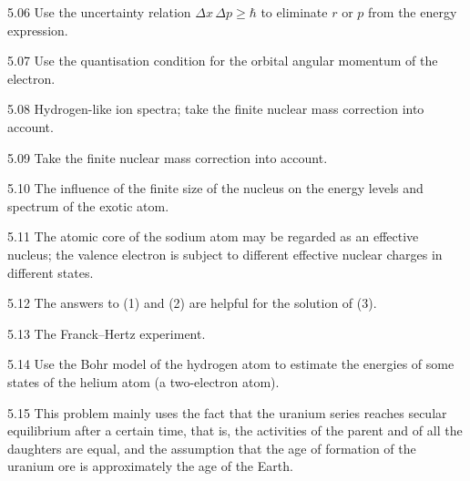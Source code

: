 \begin{hint}{5.06}
Use the uncertainty relation $\Delta x\,\Delta p\geq\hbar$ to eliminate $r$ or $p$ from the energy expression.
\end{hint}

\begin{hint}{5.07}
Use the quantisation condition for the orbital angular momentum of the electron.
\end{hint}

\begin{hint}{5.08}
Hydrogen-like ion spectra; take the finite nuclear mass correction into account.
\end{hint}

\begin{hint}{5.09}
Take the finite nuclear mass correction into account.
\end{hint}

\begin{hint}{5.10}
The influence of the finite size of the nucleus on the energy levels and spectrum of the exotic atom.
\end{hint}

\begin{hint}{5.11}
The atomic core of the sodium atom may be regarded as an effective nucleus; the valence electron is subject to different effective nuclear charges in different states.
\end{hint}

\begin{hint}{5.12}
The answers to (1) and (2) are helpful for the solution of (3).
\end{hint}

\begin{hint}{5.13}
The Franck--Hertz experiment.
\end{hint}

\begin{hint}{5.14}
Use the Bohr model of the hydrogen atom to estimate the energies of some states of the helium atom (a two-electron atom).
\end{hint}

\begin{hint}{5.15}
This problem mainly uses the fact that the uranium series reaches secular equilibrium after a certain time, that is, the activities of the parent and of all the daughters are equal, and the assumption that the age of formation of the uranium ore is approximately the age of the Earth.
\end{hint}

